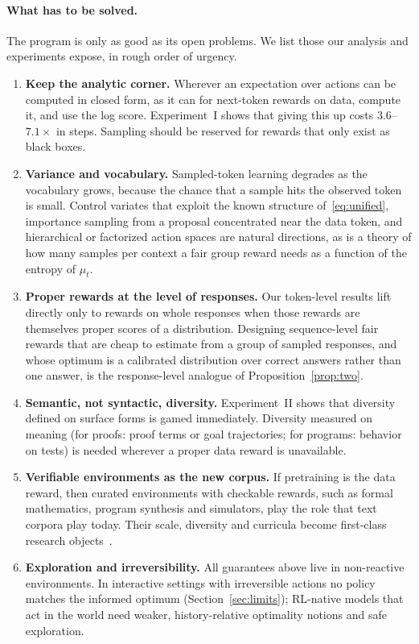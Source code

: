 \documentclass[11pt]{article}
\theoremstyle{definition}
\begin{document}
\paragraph{What has to be solved.} The program is only as good as its open problems. We list those our analysis and experiments expose, in rough order of urgency.
\begin{enumerate}[leftmargin=*,label=\textbf{P\arabic*.},itemsep=3pt]
\item \textbf{Keep the analytic corner.} Wherever an expectation over actions can be computed in closed form, as it can for next-token rewards on data, compute it, and use the log score. Experiment~I shows that giving this up costs $3.6$--$7.1\times$ in steps. Sampling should be reserved for rewards that only exist as black boxes.
\item \textbf{Variance and vocabulary.} Sampled-token learning degrades as the vocabulary grows, because the chance that a sample hits the observed token is small. Control variates that exploit the known structure of~\eqref{eq:unified}, importance sampling from a proposal concentrated near the data token, and hierarchical or factorized action spaces are natural directions, as is a theory of how many samples per context a fair group reward needs as a function of the entropy of $\mu_t$.
\item \textbf{Proper rewards at the level of responses.} Our token-level results lift directly only to rewards on whole responses when those rewards are themselves proper scores of a distribution. Designing sequence-level fair rewards that are cheap to estimate from a group of sampled responses, and whose optimum is a calibrated distribution over correct answers rather than one answer, is the response-level analogue of Proposition~\ref{prop:two}.
\item \textbf{Semantic, not syntactic, diversity.} Experiment~II shows that diversity defined on surface forms is gamed immediately. Diversity measured on meaning (for proofs: proof terms or goal trajectories; for programs: behavior on tests) is needed wherever a proper data reward is unavailable.
\item \textbf{Verifiable environments as the new corpus.} If pretraining is the data reward, then curated environments with checkable rewards, such as formal mathematics, program synthesis and simulators, play the role that text corpora play today. Their scale, diversity and curricula become first-class research objects~\cite{polu2023curriculum,yang2023leandojo}.
\item \textbf{Exploration and irreversibility.} All guarantees above live in non-reactive environments. In interactive settings with irreversible actions no policy matches the informed optimum (Section~\ref{sec:limits}); RL-native models that act in the world need weaker, history-relative optimality notions and safe exploration.

\end{enumerate}
\end{document}
